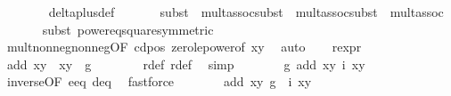 \begin{isabellebody}
\ \ \ \ \ \ \isamarkupfalse%
\ delta{\isacharunderscore}plus{\isacharunderscore}def\isanewline
\ \ \ \ \ \ \isamarkupfalse%
{\isacharparenleft}subst\ {\isacharparenleft}{}{\isacharparenright}\ mult{\isachardot}assoc{\isacharcomma}subst\ {\isacharparenleft}{}{\isacharparenright}\ mult{\isachardot}assoc{\isacharcomma}subst\ {\isacharparenleft}{}{\isacharparenright}\ mult{\isachardot}assoc{\isacharparenright}\isanewline
\ \ \ \ \ \ \isamarkupfalse%
{\isacharparenleft}subst\ power{}{\isacharunderscore}eq{\isacharunderscore}square{\isacharbrackleft}symmetric{\isacharbrackright}{\isacharparenright}\isanewline
\ \ \ \ \ \ \isamarkupfalse%
\ mult{\isacharunderscore}nonneg{\isacharunderscore}nonneg{\isacharbrackleft}OF\ c{\isacharunderscore}d{\isacharunderscore}pos\ zero{\isacharunderscore}le{\isacharunderscore}power{}{\isacharbrackleft}of\ {\isachardoublequoteopen}x{\isacharasterisk}y{\isachardoublequoteclose}{\isacharbrackright}{\isacharbrackright}\ \isamarkupfalse%
\ auto\isanewline
\ \ \isamarkupfalse%
\ r{\isacharunderscore}expr\ \isamarkupfalse%
\ {\isachardoublequoteopen}add\ {\isacharparenleft}x{\isacharcomma}y{\isacharparenright}\ {\isacharparenleft}{\isasymtau}\ {\isacharparenleft}x{\isacharprime}{\isacharcomma}y{\isacharprime}{\isacharparenright}{\isacharparenright}\ {\isacharequal}\ g\ {\isacharparenleft}{}{\isacharcomma}{}{\isacharparenright}{\isachardoublequoteclose}\ \isanewline
\ \ \ \ \isamarkupfalse%
\ r{}{\isacharunderscore}def\ r{}{\isacharunderscore}def\ \isamarkupfalse%
\ simp\isanewline
\ \ \isamarkupfalse%
\ \isamarkupfalse%
\ {\isachardoublequoteopen}{\isachardot}{\isachardot}{\isachardot}\ {\isacharequal}\ g\ {\isacharparenleft}add\ {\isacharparenleft}x{\isacharcomma}y{\isacharparenright}\ {\isacharparenleft}i\ {\isacharparenleft}x{\isacharcomma}y{\isacharparenright}{\isacharparenright}{\isacharparenright}{\isachardoublequoteclose}\isanewline
\ \ \ \ \isamarkupfalse%
\ inverse{\isacharbrackleft}OF\ e{\isacharunderscore}eq\ d{\isacharunderscore}eq{\isacharbrackright}\ \isamarkupfalse%
\ fastforce\isanewline
\ \ \isamarkupfalse%
\ \isamarkupfalse%
\ {\isachardoublequoteopen}{\isachardot}{\isachardot}{\isachardot}\ {\isacharequal}\ add\ {\isacharparenleft}x{\isacharcomma}y{\isacharparenright}\ {\isacharparenleft}{\isacharparenleft}g\ {\isasymcirc}\ i{\isacharparenright}\ {\isacharparenleft}x{\isacharcomma}y{\isacharparenright}{\isacharparenright}{\isachardoublequoteclose}\isanewline

\end{isabellebody}
